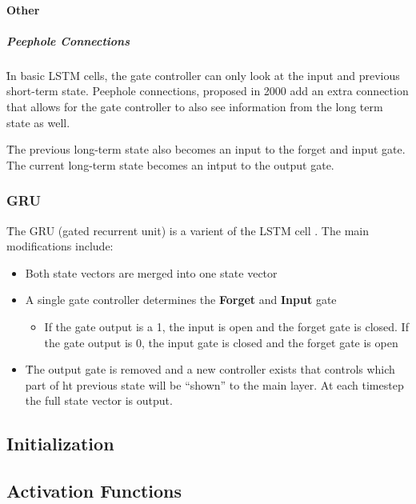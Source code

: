 \paragraph{Other}

\subparagraph{Peephole Connections}

\r{In basic LSTM cells, the gate controller can only look at the input and previous short-term state. Peephole connections, proposed in 2000  add an extra connection that allows for the gate controller to also see information from the long term state as well. }

\r{The previous long-term state also becomes an input to the forget and input gate. The current long-term state becomes an intput to the output gate.}



\subsubsection{GRU}

\r{The GRU (gated recurrent unit) is a varient of the LSTM cell . The main modifications include:}

\begin{itemize}[noitemsep,topsep=0pt]
	\item Both state vectors are merged into one state vector
	\item A single gate controller determines the \textbf{Forget} and \textbf{Input} gate
	\begin{itemize}[noitemsep,topsep=0pt]
		\item If the gate output is a 1, the input is open and the forget gate is closed. If the gate output is 0, the input gate is closed and the forget gate is open
	\end{itemize}
	\item \r{The output gate is removed and a new controller exists that controls which part of ht previous state will be ``shown'' to the main layer}. At each timestep the full state vector is output.
\end{itemize}



\subsection{Initialization}

\subsection{Activation Functions}

